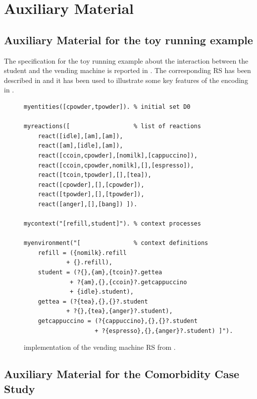 
\section{Auxiliary Material}

\subsection{Auxiliary Material for the toy running example}

The \BioResolve specification for the toy running example about the interaction between the student and the vending machine is reported in . The corresponding RS has been described in  and it has been used to illustrate some key features of the \GROOVE encoding in .

\begin{figure}[t]
\begin{minipage}{0.9\linewidth}
\footnotesize
\begin{verbatim}
myentities([cpowder,tpowder]). % initial set D0

myreactions([                  % list of reactions
    react([idle],[am],[am]),
    react([am],[idle],[am]),
    react([ccoin,cpowder],[nomilk],[cappuccino]),
    react([ccoin,cpowder,nomilk],[],[espresso]),
    react([tcoin,tpowder],[],[tea]),
    react([cpowder],[],[cpowder]),
    react([tpowder],[],[tpowder]),
    react([anger],[],[bang]) ]).

mycontext("[refill,student]"). % context processes

myenvironment("[               % context definitions
    refill = ({nomilk}.refill 
            + {}.refill),
    student = (?{},{am},{tcoin}?.gettea 
             + ?{am},{},{ccoin}?.getcappuccino 
             + {idle}.student),
    gettea = (?{tea},{},{}?.student
            + ?{},{tea},{anger}?.student),
    getcappuccino = (?{cappuccino},{},{}?.student 
                    + ?{espresso},{},{anger}?.student) ]").
\end{verbatim}
\end{minipage}
\caption{\BioResolve implementation of the vending machine RS from .}
\label{fig:bioresolve:toy}
\end{figure}

\subsection{Auxiliary Material for the Comorbidity Case Study}

